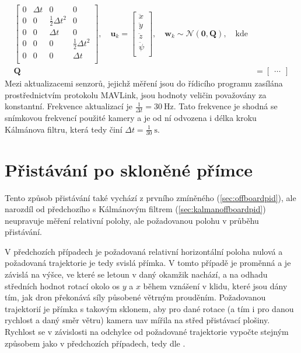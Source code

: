 \begin{align}
\begin{bmatrix}
                0 & \Delta t & 0 & 0 \\
                0 & 0 & \frac{1}{2}\Delta t^2 & 0 \\
                0 & 0 & \Delta t & 0 \\
                0 & 0 & 0 & \frac{1}{2}\Delta t^2 \\
                0 & 0 & 0 & \Delta t \\
            \end{bmatrix}, \quad \mathbf{u}_k = \begin{bmatrix}
                \ddot x \\
                \ddot y \\
                \ddot z \\
                \ddot \psi \\
            \end{bmatrix}, \quad \mathbf{w}_k \sim \mathcal{N}(\mathbf{0},\mathbf{Q}),\quad\mathrm{kde}\\
            \mathbf{Q} &= \begin{bmatrix}
                \dots %
            \end{bmatrix}
        \end{align}
        Mezi aktualizacemi senzorů, jejichž měření jsou do řídicího programu zasílána prostřednictvím protokolu MAVLink, jsou hodnoty veličin považovány za konstantní. Frekvence aktualizací je $\frac{1}{\Delta t} = 30~\mathrm{Hz}$. Tato frekvence je shodná se snímkovou frekvencí použité kamery a je od ní odvozena i délka kroku Kálmánova filtru, která tedy činí $\Delta t=\frac{1}{30}~\mathrm{s}$.
    \section{Přistávání po skloněné přímce} \label{sec:offboardpidangle}
        Tento způsob přistávání také vychází z prvního zmíněného (\cref{sec:offboardpid}), ale narozdíl od předchozího s Kálmánovým filtrem (\cref{sec:kalmanoffboardpid}) neupravuje měření relativní polohy, ale požadovanou polohu v průběhu přistávání.
        
        V předchozích případech je požadovaná relativní horizontální poloha nulová a požadovaná trajektorie je tedy svislá přímka. V tomto případě je proměnná a je závislá na výšce, ve které se letoun v daný okamžik nachází, a na odhadu středních hodnot rotací okolo os $y$ a $x$ během vznášení v klidu, které jsou dány tím, jak dron překonává síly působené větrným prouděním. Požadovanou trajektorií je přímka s takovým sklonem, aby pro dané rotace (a tím i pro danou rychlost a daný směr větru) kamera \acrshort{uav} mířila na střed přistávací plošiny. Rychlost se v závislosti na odchylce od požadované trajektorie vypočte stejným způsobem jako v předchozích případech, tedy dle .

